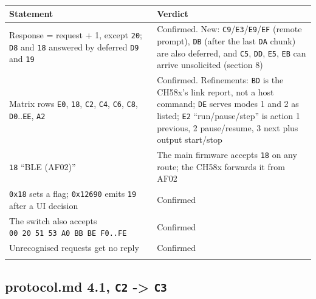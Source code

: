 {\def\LTcaptype{none} %
\begin{longtable}[]{@{}
  >{\raggedright\arraybackslash}p{}
  >{\raggedright\arraybackslash}p{}@{}}
\toprule\noalign{}
\begin{minipage}[b]{\linewidth}\raggedright
Statement
\end{minipage} & \begin{minipage}[b]{\linewidth}\raggedright
Verdict
\end{minipage} \\
\midrule\noalign{}
\endhead
\bottomrule\noalign{}
\endlastfoot
Response = request + 1, except \texttt{20}; \texttt{D8} and \texttt{18}
answered by deferred \texttt{D9} and \texttt{19} & Confirmed. New:
\texttt{C9}/\texttt{E3}/\texttt{E9}/\texttt{EF} (remote prompt),
\texttt{DB} (after the last \texttt{DA} chunk) are also deferred, and
\texttt{C5}, \texttt{DD}, \texttt{E5}, \texttt{EB} can arrive
unsolicited (section 8) \\
Matrix rows \texttt{E0}, \texttt{18}, \texttt{C2}, \texttt{C4},
\texttt{C6}, \texttt{C8}, \texttt{D0}..\texttt{EE}, \texttt{A2} &
Confirmed. Refinements: \texttt{BD} is the CH58x's link report, not a
host command; \texttt{DE} serves modes 1 and 2 as listed; \texttt{E2}
``run/pause/step'' is action 1 previous, 2 pause/resume, 3 next plus
output start/stop \\
\texttt{18} ``BLE (AF02)'' & The main firmware accepts \texttt{18} on
any route; the CH58x forwards it from AF02 \\
\texttt{0x18} sets a flag; \texttt{0x12690} emits \texttt{19} after a UI
decision & Confirmed \\
The switch also accepts \texttt{00\ 20\ 51\ 53\ A0\ BB\ BE\ F0..FE} &
Confirmed \\
Unrecognised requests get no reply & Confirmed \\*
\end{longtable}
}

\subsection{\texorpdfstring{protocol.md 4.1, \texttt{C2} -\textgreater{}
\texttt{C3}}{protocol.md 4.1, C2 -\textgreater{} C3}}\label{protocol.md-4.1-c2---c3}

